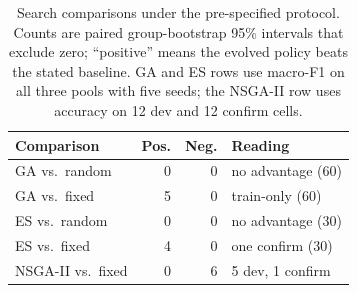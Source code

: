 \begin{table}[!b]
\centering
\small
\caption{Search comparisons under the pre-specified protocol. Counts are
paired group-bootstrap 95\% intervals that exclude zero; ``positive'' means the
evolved policy beats the stated baseline. GA and ES rows use macro-F1 on all
three pools with five seeds; the NSGA-II row uses accuracy on 12 dev and 12
confirm cells.}
\label{tab:search}
\begin{tabular}{@{}lrrl@{}}
\toprule
Comparison & Pos. & Neg. & Reading \\
\midrule
GA vs.\ random & 0 & 0 & no advantage (60) \\
GA vs.\ fixed & 5 & 0 & train-only (60) \\
ES vs.\ random & 0 & 0 & no advantage (30) \\
ES vs.\ fixed & 4 & 0 & one confirm (30) \\
NSGA-II vs.\ fixed & 0 & 6 & 5 dev, 1 confirm \\
\bottomrule
\end{tabular}
\end{table}
